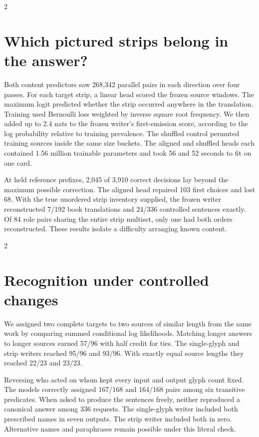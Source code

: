 \begin{multicols}{2}
\section*{Which pictured strips belong in the answer?}
Both content predictors saw 268,342 parallel pairs in each direction over four passes. For each target strip, a linear head scored the frozen source windows. The maximum logit predicted whether the strip occurred anywhere in the translation. Training used Bernoulli loss weighted by inverse square root frequency. We then added up to 2.4 nats to the frozen writer's first-emission score, according to the log probability relative to training prevalence. The shuffled control permuted training sources inside the same size buckets. The aligned and shuffled heads each contained 1.56 million trainable parameters and took 56 and 52 seconds to fit on one card.

At held reference prefixes, 2,045 of 3,910 correct decisions lay beyond the maximum possible correction. The aligned head repaired 103 first choices and lost 68. With the true unordered strip inventory supplied, the frozen writer reconstructed 7/192 book translations and 24/336 controlled sentences exactly. Of 84 role pairs sharing the entire strip multiset, only one had both orders reconstructed. These results isolate a difficulty arranging known content.
\end{multicols}
\begin{multicols}{2}
\section*{Recognition under controlled changes}
We assigned two complete targets to two sources of similar length from the same work by comparing summed conditional log likelihoods. Matching longer answers to longer sources earned 57/96 with half credit for ties. The single-glyph and strip writers reached 95/96 and 93/96. With exactly equal source lengths they reached 22/23 and 23/23.

Reversing who acted on whom kept every input and output glyph count fixed. The models correctly assigned 167/168 and 164/168 pairs among six transitive predicates. When asked to produce the sentences freely, neither reproduced a canonical answer among 336 requests. The single-glyph writer included both prescribed names in seven outputs. The strip writer included both in zero. Alternative names and paraphrases remain possible under this literal check.
\end{multicols}
